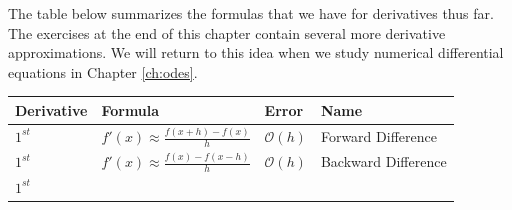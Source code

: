 \documentclass[
]{book}
\theoremstyle{definition}
\theoremstyle{definition}
\theoremstyle{definition}
\theoremstyle{remark}
\begin{document}
The table below summarizes the formulas that we have for derivatives thus far. The exercises at the end of this chapter contain several more derivative approximations. We will return to this idea when we study numerical differential equations in Chapter \ref{ch:odes}.

\begin{longtable}[]{@{}llll@{}}
\toprule
\begin{minipage}[b]{0.34\columnwidth}\raggedright
Derivative\strut
\end{minipage} & \begin{minipage}[b]{0.24\columnwidth}\raggedright
Formula\strut
\end{minipage} & \begin{minipage}[b]{0.17\columnwidth}\raggedright
Error\strut
\end{minipage} & \begin{minipage}[b]{0.14\columnwidth}\raggedright
Name\strut
\end{minipage}\tabularnewline
\midrule
\endhead
\begin{minipage}[t]{0.34\columnwidth}\raggedright
\(1^{st}\)\strut
\end{minipage} & \begin{minipage}[t]{0.24\columnwidth}\raggedright
\(f'(x) \approx \frac{f(x+h) - f(x)}{h}\)\strut
\end{minipage} & \begin{minipage}[t]{0.17\columnwidth}\raggedright
\(\mathcal{O}(h)\)\strut
\end{minipage} & \begin{minipage}[t]{0.14\columnwidth}\raggedright
Forward Difference\strut
\end{minipage}\tabularnewline
\begin{minipage}[t]{0.34\columnwidth}\raggedright
\(1^{st}\)\strut
\end{minipage} & \begin{minipage}[t]{0.24\columnwidth}\raggedright
\(f'(x) \approx \frac{f(x) - f(x-h)}{h}\)\strut
\end{minipage} & \begin{minipage}[t]{0.17\columnwidth}\raggedright
\(\mathcal{O}(h)\)\strut
\end{minipage} & \begin{minipage}[t]{0.14\columnwidth}\raggedright
Backward Difference\strut
\end{minipage}\tabularnewline
\begin{minipage}[t]{0.34\columnwidth}\raggedright
\(1^{st}\)\strut

\end{minipage}
\end{longtable}
\end{document}
